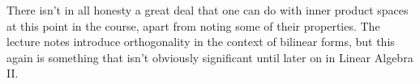 \documentclass{tikzposter} %
\begin{document}
\begin{columns}
{{    There isn't in all honesty a great deal that one can do with inner product spaces at this point in the course, apart from noting some of their properties. The lecture notes introduce orthogonality in the context of bilinear forms, but this again is something that isn't obviously significant until later on in Linear Algebra II.
  }
}

\end{columns}
\end{document}
